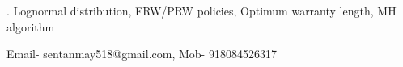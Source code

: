 \documentclass[12pt]{article}
\begin{document}
\vskip 2mm

.
Lognormal distribution, FRW/PRW policies, Optimum warranty length, MH algorithm

\vfill
Email- sentanmay518@gmail.com, 
 Mob- 918084526317


%        
%
%        







\end{document}
